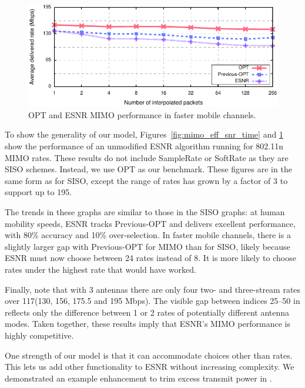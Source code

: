 \begin{figure}[t]
      \centering
      \includegraphics[width=.95\columnwidth]{figures/rate/mimo_rate_skip.pdf}
      \caption{\label{fig:mimo_eff_snr_speedup} OPT and ESNR MIMO performance in faster mobile channels.}
\end{figure}

To show the generality of our model, Figures~\ref{fig:mimo_eff_snr_time} and \ref{fig:mimo_eff_snr_speedup} show the performance of an unmodified ESNR algorithm running for 802.11n MIMO rates. These results do not include SampleRate or SoftRate as they are SISO schemes. Instead, we use OPT as our benchmark.
These figures are in the same form as for SISO, except the range of rates has grown by a factor of 3 to support up to 195\Mbps. 

The trends in these graphs are similar to those in the SISO graphs: at human mobility speeds, ESNR tracks Previous-OPT and delivers excellent performance, with 80\% accuracy and 10\% over-selection. In faster mobile channels, there is a slightly larger gap with Previous-OPT for MIMO than for SISO, likely because ESNR must now choose between 24 rates instead of 8. It is more likely to choose rates under the highest rate that would have worked. 

Finally, note that with 3 antennas there are only four two- and three-stream rates over 117\Mbps (130, 156, 175.5 and 195 Mbps). The visible gap between indices 25--50 in  reflects only the difference between 1 or 2 rates of potentially different antenna modes. Taken together, these results imply that ESNR's MIMO performance is highly competitive.


One strength of our model is that it can accommodate choices other than rates. This lets us add other functionality to ESNR without increasing complexity. We demonstrated an example enhancement to trim excess transmit power in .

